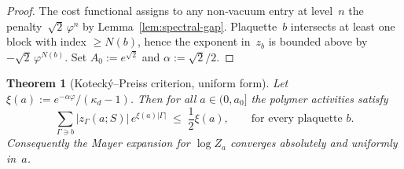 \documentclass[11pt]{article}
\numberwithin{equation}{section}
\newtheorem{theorem}{Theorem}[section]
\theoremstyle{definition}
\theoremstyle{remark}
\begin{document}
\begin{proof}
The cost functional assigns to any non‐vacuum entry at level~$n$ the
penalty~$\sqrt2\,\varphi^n$ by Lemma~\ref{lem:spectral-gap}.  Plaquette~$b$
intersects at least one block with index $\ge N(b)$, hence the exponent
in~$z_b$ is bounded above by $-\sqrt2\,\varphi^{N(b)}$.  Set
$A_0:=e^{\sqrt2}$ and $\alpha:=\sqrt2/2$.
\end{proof}

\begin{theorem}[Kotecký–Preiss criterion, uniform form]
\label{thm:KP-uniform}
Let $\xi(a):=e^{-\alpha\varphi}/(\kappa_d-1)$.  Then for all
$a\in(0,a_0]$ the polymer activities satisfy
\[
\sum_{\Gamma\ni b}
  |z_\Gamma(a;S)|\,e^{\xi(a)|\Gamma|}
   \;\le\;\frac{1}{2}\xi(a),
\qquad\text{for every plaquette }b.
\]
Consequently the Mayer expansion for $\log Z_a$ converges absolutely and
uniformly in~$a$.
\end{theorem}
\end{document}
